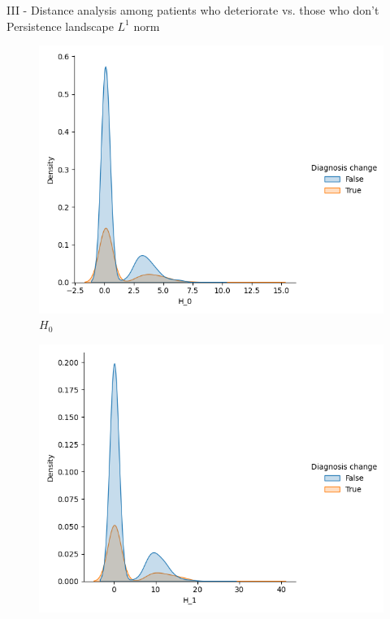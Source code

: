 \documentclass[aspectratio=169, 10pt, dvipsnames]{beamer}
\begin{document}
\begin{frame}[fragile]{III - Distance analysis among patients who deteriorate vs. those who don't}
Persistence landscape $L^1$ norm\\
  \begin{figure}
    \centering
    \includegraphics[width=\textwidth]{figures/temporal_evolution/landscape_H_0_dist_diag_change.png}
    \caption{$H_0$}
  \end{figure}
  \endminipage
  \hfill
  \begin{figure}
    \centering
    \includegraphics[width=\textwidth]{figures/temporal_evolution/landscape_H_1_dist_diag_change.png}

\end{figure}
\end{frame}
\end{document}
